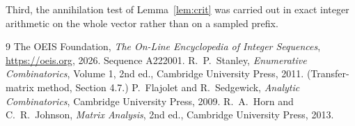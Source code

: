\documentclass[11pt,a4paper]{article}
\theoremstyle{plain}
\theoremstyle{definition}
\begin{document}
Third, the annihilation test of Lemma~\ref{lem:crit} was carried out in exact integer
arithmetic on the whole vector rather than on a sampled prefix.

\begin{thebibliography}{9}
 The OEIS Foundation, \emph{The On-Line Encyclopedia of Integer
Sequences}, \url{https://oeis.org}, 2026. Sequence A222001.
 R.~P.~Stanley, \emph{Enumerative Combinatorics}, Volume 1, 2nd ed.,
Cambridge University Press, 2011. (Transfer-matrix method, Section 4.7.)
 P.~Flajolet and R.~Sedgewick, \emph{Analytic Combinatorics}, Cambridge
University Press, 2009.
 R.~A.~Horn and C.~R.~Johnson, \emph{Matrix Analysis}, 2nd ed., Cambridge
University Press, 2013.
\end{thebibliography}
\end{document}

